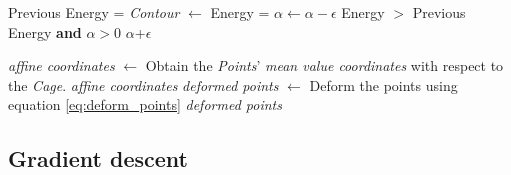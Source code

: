 \begin{algorithm}[h]
\begin{algorithmic}[1]
		\Statex
		\State Previous Energy = 
		\Do 
		\State \textit{Contour} $\leftarrow$ 
		\State Energy = 
		\State $\alpha \leftarrow \alpha-\epsilon$
		\doWhile Energy $>$ Previous Energy \textbf{and} $\alpha>0$
		\State \Return $\alpha$+$\epsilon$
		\EndFunction
		
		
		\Statex
		\State \textit{affine coordinates} $\leftarrow$  Obtain the \textit{Points}' \textit{mean value coordinates} with respect to the \textit{Cage}.
		\State \Return \textit{affine coordinates}
		\EndFunction
		\Statex
		\State \textit{deformed points} $\leftarrow$  Deform the points using equation \eqref{eq:deform_points}
		\State \Return \textit{deformed points}
		\EndFunction
	\end{algorithmic}
\end{algorithm}

\subsection{Gradient descent}
\label{subsubsec:gradient_descent}

